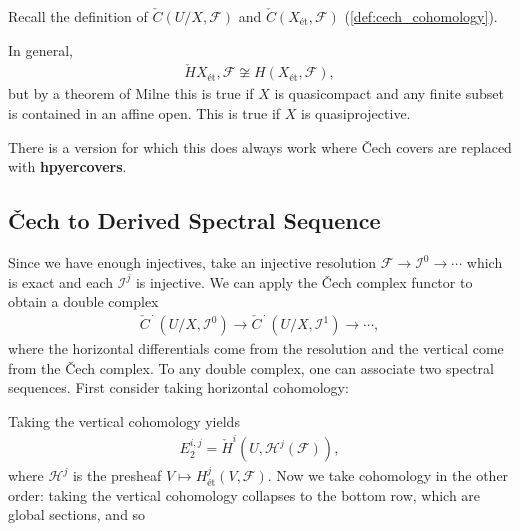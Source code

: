 Recall the definition of \(\check{C}(U/X, \mathcal{F})\) and
\(\check{C}(X_\text{ét}, \mathcal{F})\) (\cref{def:cech_cohomology}).

\begin{warnings}

In general,
\begin{align*}
{\check{H}}{X_\text{ét}, \mathcal{F}} \not\cong H(X_\text{ét}, \mathcal{F})
,\end{align*}
but by a theorem of Milne this is true if \(X\) is quasicompact and any
finite subset is contained in an affine open. This is true if \(X\) is
quasiprojective.

\end{warnings}

\begin{remark}

There is a version for which this does always work where Čech covers are
replaced with \textbf{hpyercovers}.

\end{remark}

\hypertarget{ux10dech-to-derived-spectral-sequence}{%
\subsection{Čech to Derived Spectral
Sequence}\label{ux10dech-to-derived-spectral-sequence}}

Since we have enough injectives, take an injective resolution
\(\mathcal{F}\to \mathcal{I}^0 \to \cdots\) which is exact and each
\(\mathcal{I}^j\) is injective. We can apply the Čech complex functor to
obtain a double complex
\begin{align*}
{\check{C}}^{\,\cdot\,}(U/X, \mathcal{I}^0) \to {\check{C}}^{\,\cdot\,}(U/X, \mathcal{I}^1) \to \cdots
,\end{align*}
where the horizontal differentials come from the resolution and the
vertical come from the Čech complex. To any double complex, one can
associate two spectral sequences. First consider taking horizontal
cohomology:

Taking the vertical cohomology yields
\begin{align*}  
E_2^{i, j} = {\check{H}}^i(U, \mathcal{H}^j(\mathcal{F}))
,\end{align*}
where \(\mathcal{H}^j\) is the presheaf
\(V\mapsto H_\text{ét}^j(V, \mathcal{F})\). Now we take cohomology in
the other order: taking the vertical cohomology collapses to the bottom
row, which are global sections, and so

